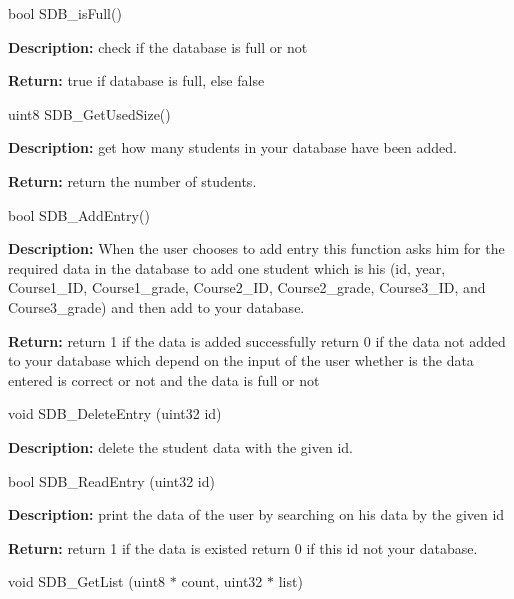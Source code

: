 \begin{DoxyItemize}
\begin{DoxyItemize}
\item {\ttfamily bool SDB\+\_\+is\+Full()}
\begin{DoxyItemize}
\item {\bfseries{Description\+:}} check if the database is full or not
\item {\bfseries{Return\+:}} {\ttfamily true} if database is full, else {\ttfamily false}
\end{DoxyItemize}
\item {\ttfamily uint8 SDB\+\_\+\+Get\+Used\+Size()}
\begin{DoxyItemize}
\item {\bfseries{Description\+:}} get how many students in your database have been added.
\item {\bfseries{Return\+:}} return the number of students.
\end{DoxyItemize}
\item {\ttfamily bool SDB\+\_\+\+Add\+Entry()}
\begin{DoxyItemize}
\item {\bfseries{Description\+:}} When the user chooses to add entry this function asks him for the required data in the database to add one student which is his (id, year, Course1\+\_\+\+ID, Course1\+\_\+grade, Course2\+\_\+\+ID, Course2\+\_\+grade, Course3\+\_\+\+ID, and Course3\+\_\+grade) and then add to your database.
\item {\bfseries{Return\+:}} return 1 if the data is added successfully return 0 if the data not added to your database which depend on the input of the user whether is the data entered is correct or not and the data is full or not
\end{DoxyItemize}
\item {\ttfamily void SDB\+\_\+\+Delete\+Entry (uint32 id)}
\begin{DoxyItemize}
\item {\bfseries{Description\+:}} delete the student data with the given id.
\end{DoxyItemize}
\item {\ttfamily bool SDB\+\_\+\+Read\+Entry (uint32 id)}
\begin{DoxyItemize}
\item {\bfseries{Description\+:}} print the data of the user by searching on his data by the given id
\item {\bfseries{Return\+:}} return 1 if the data is existed return 0 if this id not your database.
\end{DoxyItemize}
\item {\ttfamily void SDB\+\_\+\+Get\+List (uint8 \texorpdfstring{$\ast$}{*} count, uint32 \texorpdfstring{$\ast$}{*} list)}

\end{DoxyItemize}
\end{DoxyItemize}
